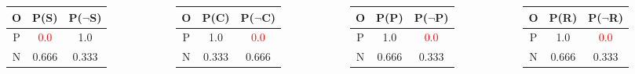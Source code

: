 \documentclass[aspectratio=169, 10pt]{beamer}
\begin{document}
\begin{frame}[t]
    \begin{columns}
        \begin{column}{0.25\textwidth}
            \begin{table}[]
                \small
                \begin{tabular}{ccc}
                O & P(S) & P($\neg$S) \\ \hline
                P & \textcolor{red}{0.0} & 1.0 \\
                N & 0.666 & 0.333 \\
                \end{tabular}
            \end{table}
        \end{column}
        \begin{column}{0.25\textwidth}
            \begin{table}[]
                \small
                \begin{tabular}{ccc}
                O & P(C) & P($\neg$C) \\ \hline
                P & 1.0 & \textcolor{red}{0.0} \\
                N & 0.333 & 0.666 \\
                \end{tabular}
            \end{table}
        \end{column}
        \begin{column}{0.25\textwidth}
            \begin{table}[]
                \small
                \begin{tabular}{ccc}
                O & P(P) & P($\neg$P) \\ \hline
                P & 1.0 & \textcolor{red}{0.0} \\
                N & 0.666 & 0.333 \\
                \end{tabular}
            \end{table}
        \end{column}
        \begin{column}{0.25\textwidth}
            \begin{table}[]
                \small
                \begin{tabular}{ccc}
                O & P(R) & P($\neg$R) \\ \hline
                P & 1.0 & \textcolor{red}{0.0} \\
                N & 0.666 & 0.333 \\
                \end{tabular}
            \end{table}
        \end{column}
    \end{columns}


\end{frame}
\end{document}
